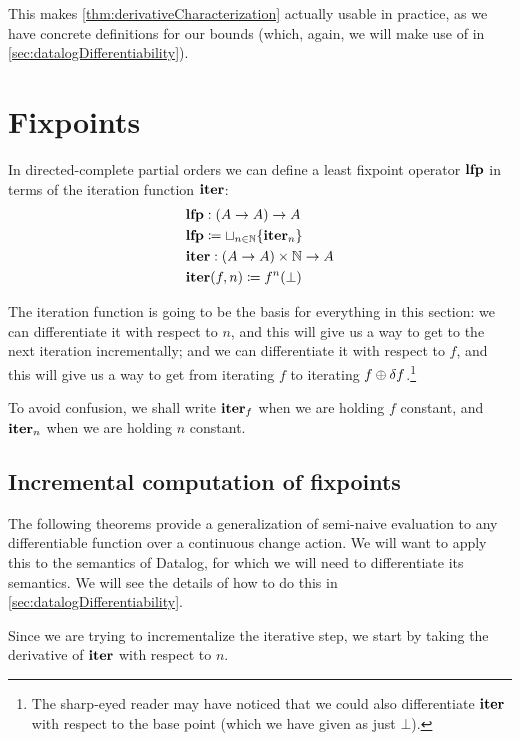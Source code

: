 This makes \cref{thm:derivativeCharacterization} actually usable in practice, as
we have concrete definitions for our bounds (which, again, we will make use of in \cref{sec:datalogDifferentiability}).

\section{Fixpoints}
\label{sec:fixpoints}

In directed-complete partial orders we can define a least fixpoint operator $\textbf{lfp}$ in terms of the
iteration function $\textbf{iter}$:
\begin{align*}
  &\textbf{lfp} : (A \rightarrow A) \rightarrow A\\
  &\textbf{lfp} \coloneqq \sqcup_{n \in \mathbb{N}} \{ \textbf{iter}_n \}\\
  &\textbf{iter} : (A \rightarrow A) \times \mathbb{N} \rightarrow A\\
  &\textbf{iter}(f, n) \coloneqq f^n(\bot)
\end{align*}

The iteration function is going to be the basis for everything in this section:
we can differentiate it with respect to $n$, and this will give us a way to get
to the next iteration incrementally; and we can differentiate it with respect to
$f$, and this will give us a way to get from iterating $f$ to iterating $f
\oplus \delta f$.\footnote{The sharp-eyed reader may have noticed that we
  could also differentiate $\textbf{iter}$ with respect to the base point (which we have
  given as just $\bot$).}

To avoid confusion, we shall write $\textbf{iter}_f$ when we are holding $f$ constant,
and $\textbf{iter}_n$ when we are holding $n$ constant.

\subsection{Incremental computation of fixpoints}

The following theorems provide a
generalization of semi-naive evaluation to any differentiable function over a
continuous change action. We will want to apply this to the semantics of
Datalog, for which we will need to differentiate its semantics. We will see the
details of how to do this in \cref{sec:datalogDifferentiability}.

Since we are trying to incrementalize the iterative step, we start by taking the
derivative of $\textbf{iter}$ with respect to $n$.

